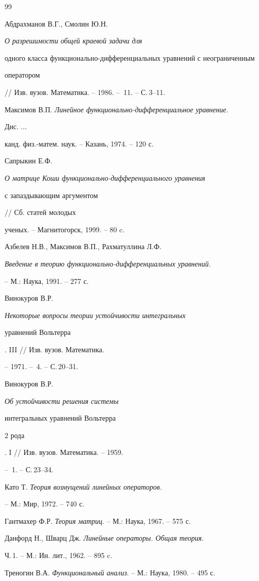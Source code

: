 \begin{thebibliography}{99}







Абдрахманов В.Г., Смолин Ю.Н. {\em О разрешимости общей краевой задачи для


одного класса функционально-дифференциальных уравнений с неограниченным


оператором} // Изв. вузов. Математика. -- 1986. -- \No\,11. -- С.\,3--11.




Максимов В.П. {\em Линейное функционально-дифференциальное уравнение}.


Дис. $\dotsc$


канд. физ.-матем. наук. -- Казань, 1974. -- 120 с.




Сапрыкин Е.Ф. {\em О матрице Коши функционально-дифференциального уравнения


с запаздывающим аргументом} // Сб. статей молодых


ученых. -- Магнитогорск, 1999. -- 80 c.




Азбелев Н.В., Максимов В.П., Рахматуллина Л.Ф.


{\em Введение в теорию функционально-дифференциальных уравнений}.


-- М.: Наука, 1991. -- 277 с.




Винокуров В.Р. {\em Некоторые вопросы теории устойчивости интегральных


уравнений Вольтерра}. III // Изв. вузов. Математика.


-- 1971. -- \No\,4. -- С.\,20--31.




Винокуров В.Р. {\em Об устойчивости решения системы


интегральных уравнений Вольтерра


$2$ рода}. I // Изв. вузов. Математика. -- 1959.


-- \No\,1. -- С.\,23--34.




Като Т. {\em Теория возмущений линейных операторов}.


-- М.: Мир, 1972. -- 740 с.




Гантмахер Ф.Р. {\em Теория матриц}. -- М.: Наука, 1967. -- 575 с.




Данфорд Н., Шварц Дж. {\em Линейные операторы. Общая теория}.


Ч.\,1. -- М.: Ин. лит., 1962. -- 895 c.




Треногин В.А. {\em Функциональный анализ}. -- М.: Наука, 1980. -- 495 с.





\end{thebibliography}





